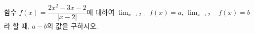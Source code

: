함수 $f(x)=\dfrac{2x^2-3x-2}{|x-2|}$에 대하여 $\displaystyle\lim_{x\to 2+}f(x)=a$, $\displaystyle\lim_{x\to 2-}f(x)=b$라 할 때, $a-b$의 값을 구하시오.
